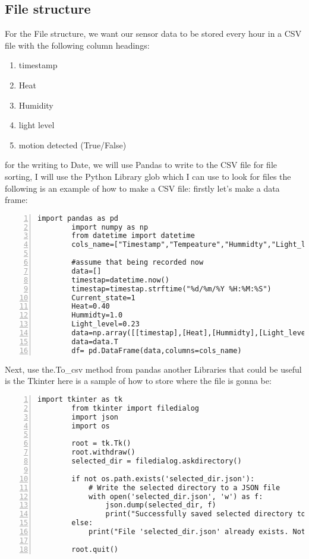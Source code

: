 	\subsection{File structure}
	For the  File structure, we want our sensor data to be stored every hour in a  CSV file with the following column headings:
	\begin{enumerate}
		\item timestamp
		\item Heat
		\item Humidity
		\item light level
		\item motion detected (True/False)
	\end{enumerate}
	for the writing to Date, we will use Pandas to write to the CSV file
	for file sorting, I will use the Python Library glob  which I can use  to look for  files 
	the following is an example of how  to  make a CSV file:
	firstly let's make a data frame:
	\begin{lstlisting}[style=mystyle,caption={sample code for turning sensor data into a data},numbers=left,firstnumber=1]
		import pandas as pd
		import numpy as np
		from datetime import datetime
		cols_name=["Timestamp","Tempeature","Hummidty","Light_level","Motion_dected"]

		#assume that being recorded now
		data=[]
		timestap=datetime.now()
		timestap=timestap.strftime("%d/%m/%Y %H:%M:%S")
		Current_state=1
		Heat=0.40
		Hummidty=1.0
		Light_level=0.23
		data=np.array([[timestap],[Heat],[Hummidty],[Light_level],[Current_state]])
		data=data.T
		df= pd.DataFrame(data,columns=cols_name)
	\end{lstlisting}
	Next, use the.To\_csv method from  pandas
	another Libraries that could  be useful is the Tkinter
	here is a  sample of how to   store where the  file is  gonna be:
	\begin{lstlisting}[style=mystyle,caption={example code for storing directory},numbers=left,firstnumber=1]
		import tkinter as tk
		from tkinter import filedialog
		import json
		import os

		root = tk.Tk()
		root.withdraw()
		selected_dir = filedialog.askdirectory()

		if not os.path.exists('selected_dir.json'):
			# Write the selected directory to a JSON file
			with open('selected_dir.json', 'w') as f:
				json.dump(selected_dir, f)
				print("Successfully saved selected directory to JSON file.")
		else:
			print("File 'selected_dir.json' already exists. Not saving the directory.")

		root.quit()
	\end{lstlisting}
